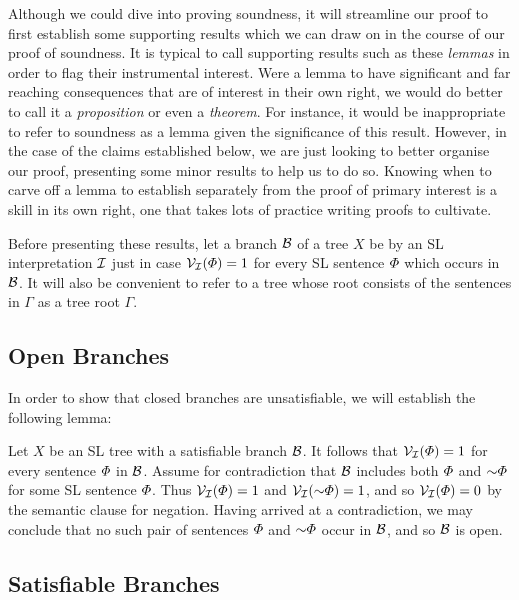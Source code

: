 Although we could dive into proving soundness, it will streamline our proof to first establish some supporting results which we can draw on in the course of our proof of soundness.
It is typical to call supporting results such as these \textit{lemmas} in order to flag their instrumental interest.
Were a lemma to have significant and far reaching consequences that are of interest in their own right, we would do better to call it a \textit{proposition} or even a \textit{theorem}.
For instance, it would be inappropriate to refer to soundness as a lemma given the significance of this result.
However, in the case of the claims established below, we are just looking to better organise our proof, presenting some minor results to help us to do so.
Knowing when to carve off a lemma to establish separately from the proof of primary interest is a skill in its own right, one that takes lots of practice writing proofs to cultivate.

Before presenting these results, let a branch $\mathcal{B}$ of a tree $X$ be  by an SL interpretation $\mathcal{I}$ just in case $\mathcal{V}_{\mathcal{I}}(\varPhi)=1$ for every SL sentence $\varPhi$ which occurs in $\mathcal{B}$.
It will also be convenient to refer to a tree whose root consists of the sentences in $\Gamma$ as a tree  root $\Gamma$.



\subsection{Open Branches}

In order to show that closed branches are unsatisfiable, we will establish the following lemma:

\label{OpenBranchLemma}

Let $X$ be an SL tree with a satisfiable branch $\mathcal{B}$.
It follows that $\mathcal{V}_{\mathcal{I}}(\varPhi)=1$ for every sentence $\varPhi$ in $\mathcal{B}$.
Assume for contradiction that $\mathcal{B}$ includes both $\varPhi$ and $\enot \metaA$ for some SL sentence $\varPhi$.
Thus $\mathcal{V}_{\mathcal{I}}(\varPhi)=1$ and $\V{\I}(\enot\metaA)=1$, and so $\mathcal{V}_{\mathcal{I}}(\varPhi)=0$ by the semantic clause for negation.
Having arrived at a contradiction, we may conclude that no such pair of sentences $\varPhi$ and $\enot \metaA$ occur in $\mathcal{B}$, and so $\mathcal{B}$ is open. 






\subsection{Satisfiable Branches}

